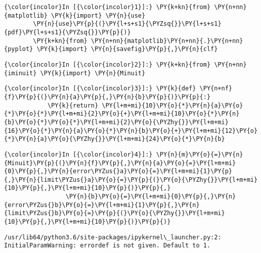     \begin{Verbatim}[commandchars=\\\{\}]
{\color{incolor}In [{\color{incolor}1}]:} \PY{k+kn}{from} \PY{n+nn}{matplotlib} \PY{k}{import} \PY{n}{use}
        \PY{n}{use}\PY{p}{(}\PY{l+s+s1}{\PYZsq{}}\PY{l+s+s1}{pdf}\PY{l+s+s1}{\PYZsq{}}\PY{p}{)}
        \PY{k+kn}{from} \PY{n+nn}{matplotlib}\PY{n+nn}{.}\PY{n+nn}{pyplot} \PY{k}{import} \PY{n}{savefig}\PY{p}{,}\PY{n}{clf}
\end{Verbatim}


    \begin{Verbatim}[commandchars=\\\{\}]
{\color{incolor}In [{\color{incolor}2}]:} \PY{k+kn}{from} \PY{n+nn}{iminuit} \PY{k}{import} \PY{n}{Minuit}
\end{Verbatim}


    \begin{Verbatim}[commandchars=\\\{\}]
{\color{incolor}In [{\color{incolor}3}]:} \PY{k}{def} \PY{n+nf}{f}\PY{p}{(}\PY{n}{a}\PY{p}{,}\PY{n}{b}\PY{p}{)}\PY{p}{:}
            \PY{k}{return} \PY{l+m+mi}{10}\PY{o}{*}\PY{n}{a}\PY{o}{*}\PY{o}{*}\PY{l+m+mi}{2}\PY{o}{+}\PY{l+m+mi}{10}\PY{o}{*}\PY{n}{b}\PY{o}{*}\PY{o}{*}\PY{l+m+mi}{2}\PY{o}{\PYZhy{}}\PY{l+m+mi}{16}\PY{o}{*}\PY{n}{a}\PY{o}{*}\PY{n}{b}\PY{o}{+}\PY{l+m+mi}{12}\PY{o}{*}\PY{n}{a}\PY{o}{\PYZhy{}}\PY{l+m+mi}{24}\PY{o}{*}\PY{n}{b}
\end{Verbatim}


    \begin{Verbatim}[commandchars=\\\{\}]
{\color{incolor}In [{\color{incolor}4}]:} \PY{n}{m}\PY{o}{=}\PY{n}{Minuit}\PY{p}{(}\PY{n}{f}\PY{p}{,}\PY{n}{a}\PY{o}{=}\PY{l+m+mi}{0}\PY{p}{,}\PY{n}{error\PYZus{}a}\PY{o}{=}\PY{l+m+mi}{1}\PY{p}{,}\PY{n}{limit\PYZus{}a}\PY{o}{=}\PY{p}{(}\PY{o}{\PYZhy{}}\PY{l+m+mi}{10}\PY{p}{,}\PY{l+m+mi}{10}\PY{p}{)}\PY{p}{,}
                 \PY{n}{b}\PY{o}{=}\PY{l+m+mi}{0}\PY{p}{,}\PY{n}{error\PYZus{}b}\PY{o}{=}\PY{l+m+mi}{1}\PY{p}{,}\PY{n}{limit\PYZus{}b}\PY{o}{=}\PY{p}{(}\PY{o}{\PYZhy{}}\PY{l+m+mi}{10}\PY{p}{,}\PY{l+m+mi}{10}\PY{p}{)}\PY{p}{)}
\end{Verbatim}


    \begin{Verbatim}[commandchars=\\\{\}]
/usr/lib64/python3.6/site-packages/ipykernel\_launcher.py:2: InitialParamWarning: errordef is not given. Default to 1.
  

    \end{Verbatim}

